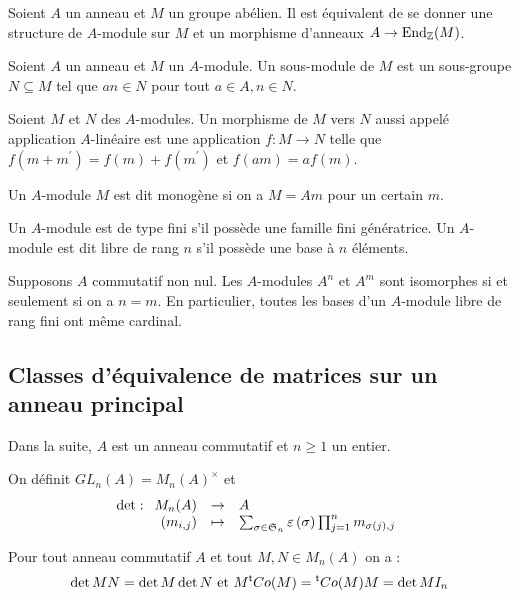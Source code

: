 \documentclass{cours}
\begin{document}
\begin{proposition}
    Soient $A$ un anneau et $M$ un groupe abélien. Il est équivalent de se donner une structure de $A$-module sur $M$ et un morphisme d'anneaux $A \rightarrow \text{End}_{\mathbb{Z}}(M)$.
\end{proposition}

\begin{definition}
    Soient $A$ un anneau et $M$ un $A$-module. Un sous-module de $M$ est un sous-groupe $N \subseteq M$ tel que $an \in N$ pour tout $a \in A, n \in N$.
\end{definition}
\begin{definition}
    Soient $M$ et $N$ des $A$-modules. Un morphisme de $M$ vers $N$ aussi appelé application $A$-linéaire est une application $f : M \to N$ telle que $f(m + m^{'}) = f(m) + f(m^{'})$ et $f(am) = af(m)$.
\end{definition}

\begin{definition}
    Un $A$-module $M$ est dit monogène si on a $M = Am$ pour un certain $m$.
\end{definition}

\begin{definition}
    Un $A$-module est de type fini s'il possède une famille fini génératrice. Un $A$-module est dit libre de rang $n$ s'il possède une base à $n$ éléments.
\end{definition}

\begin{theorem}
    Supposons $A$ commutatif non nul. Les $A$-modules $A^{n}$ et $A^{m}$ sont isomorphes si et seulement si on a $n = m$. En particulier, toutes les bases d'un $A$-module libre de rang fini ont même cardinal.
\end{theorem}


\subsection{Classes d'équivalence de matrices sur un anneau principal}
Dans la suite, $A$ est un anneau commutatif et $n \geq 1$ un entier.

\begin{definition}
    On définit $GL_{n}(A) = M_{n}(A)^{\times}$ et
    \[
        \det : \begin{array}[t]{rcl} M_{n}(A) & \to & A \\ \left(m_{i,j}\right) & \mapsto & \sum_{\sigma \in \mathfrak{S}_{n}}\varepsilon\left(\sigma\right)\prod_{j = 1}^{n}m_{\sigma(j), j} \end{array}
    \]
\end{definition}

\begin{lemma}
    Pour tout anneau commutatif $A$ et tout $M, N \in M_{n}(A)$ on a :
    \[
        \det MN = \det M \det N \text{ et } M{^{\mathsf{t}}}Co(M) = {^{\mathsf{t}}}Co(M)M = \det M I_{n}
    \]
\end{lemma}
\end{document}
